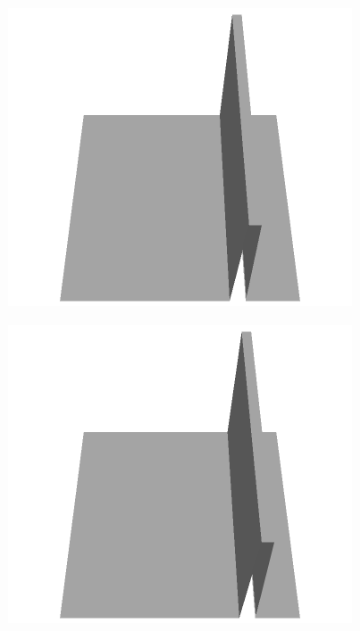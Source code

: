 \documentclass[../document.tex]{subfiles}
\begin{document}
\begin{figure}
    \begin{subfigure}[b]{0.160\textwidth}
    \includegraphics[width=\linewidth]{../img/5/custom_patches/walls_front/all/35-3d.png}
    \end{subfigure}
    \begin{subfigure}[b]{0.160\textwidth}
    \includegraphics[width=\linewidth]{../img/5/custom_patches/walls_front/all/30-3d.png}
    \end{subfigure}
    \begin{subfigure}[b]{0.160\textwidth}

\end{subfigure}
\end{figure}
\end{document}
